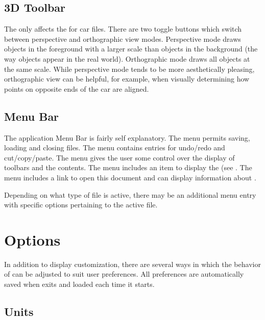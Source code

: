 \subsection{3D Toolbar} \label{ssec:3DToolbar}

The  only affects the  for car files.  There are two toggle buttons which switch between perspective and orthographic view modes.  Perspective mode draws objects in the foreground with a larger scale than objects in the background (the way objects appear in the real world).  Orthographic mode draws all objects at the same scale.  While perspective mode tends to be more aesthetically pleasing, orthographic view can be helpful, for example, when visually determining how points on opposite ends of the car are aligned.

\subsection{Menu Bar} \label{ssec:menuBar}

The application Menu Bar is fairly self explanatory.  The  menu permits saving, loading and closing files.  The  menu contains entries for undo/redo and cut/copy/paste.  The  menu gives the user some control over the display of toolbars and the  contents.  The  menu includes an item to display the  (see .  The  menu includes a link to open this document and can display information about \vvase{}.

Depending on what type of file is active, there may be an additional menu entry with specific options pertaining to the active file.

\section{Options} \label{sec:options}

In addition to display customization, there are several ways in which the behavior of \vvase{} can be adjusted to suit user preferences.  All preferences are automatically saved when \vvase{} exits and loaded each time it starts.

\subsection{Units} \label{ssec:optionsUnits}

